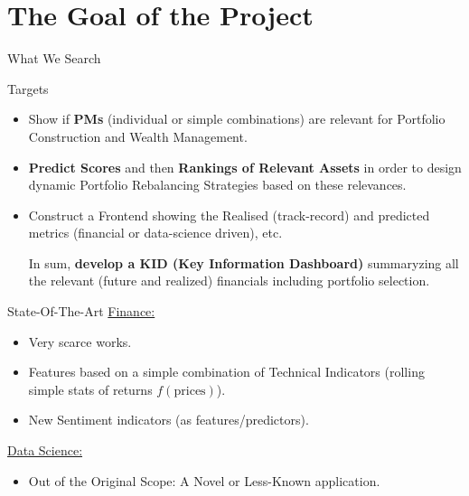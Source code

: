 \documentclass[ucs,8pt,handout]{beamer}
\begin{document}
\section{The Goal of the Project}
\begin{frame}{What We Search}
  \begin{block}{Targets}
    \begin{itemize}
      \item Show if {\bf PMs} (individual or simple combinations) are
        relevant for Portfolio Construction and Wealth Management.
        \item {\bf Predict Scores} and then {\bf Rankings of Relevant
          Assets} in order to design dynamic Portfolio Rebalancing
          Strategies based on these relevances.
          \item Construct a Frontend showing the Realised
            (track-record) and predicted metrics (financial or
            data-science driven), etc.
            
            In sum, {\bf develop a KID (Key Information Dashboard)}
            summaryzing all the relevant (future and realized)
            financials including portfolio selection. 
      \end{itemize}
    \end{block}
  \begin{block}{State-Of-The-Art}
    \underline{Finance:}
    \begin{itemize}
    \item Very scarce works.
    \item Features based on a simple combination of Technical
      Indicators (rolling simple stats of returns $f(\mathrm{prices})$).
    \item New Sentiment indicators (as features/predictors).
    \end{itemize}
    \underline{Data Science:}
    \begin{itemize}
      \item Out of the Original Scope: A Novel or Less-Known application.
      \end{itemize}
    \end{block}
\end{frame}
\end{document}
